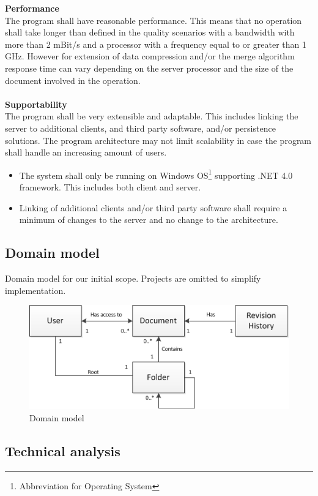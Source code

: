 \documentclass[a4paper,11pt,report]{report}
\begin{document}
\textbf{Performance} \\
The program shall have reasonable performance. This means that no operation shall take longer than defined in the quality scenarios with a bandwidth with more than 2 mBit/s and a processor with a frequency equal to or greater than 1 GHz. However for extension of data compression and/or the merge algorithm response time can vary depending on the server processor and the size of the document involved in the operation.
\\ \\
\textbf{Supportability} \\
The program shall be very extensible and adaptable. This includes linking the server to additional clients, and third party software, and/or persistence solutions. The program architecture may not limit scalability in case the program shall handle an increasing amount of users.
\begin{itemize}
\item The system shall only be running on Windows OS\footnote[7]{Abbreviation for Operating System} supporting .NET 4.0 framework. This includes both client and server.
\item Linking of additional clients and/or third party software shall require a minimum of changes to the server and no change to the architecture.
\end{itemize}

	\subsection{Domain model}
	Domain model for our initial scope. Projects are omitted to simplify implementation.
	\begin{figure}[H]
  \centering
	\includegraphics[]{./DomainModel}
\caption{Domain model }
\end{figure}
	\subsection{Technical analysis}
\end{document}
